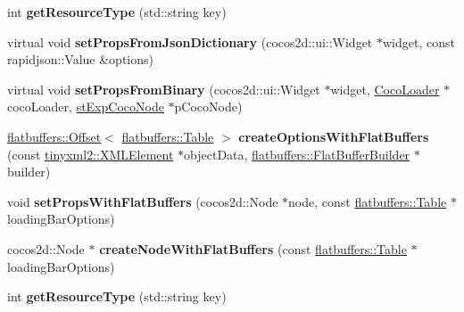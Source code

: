 \begin{DoxyCompactItemize}
int {\bfseries get\+Resource\+Type} (std\+::string key)
\item 
\mbox{\label{classcocostudio_1_1LoadingBarReader_ab5909d35968dfaf4c5348d6fe23d58f0}} 
virtual void {\bfseries set\+Props\+From\+Json\+Dictionary} (cocos2d\+::ui\+::\+Widget $\ast$widget, const rapidjson\+::\+Value \&options)
\item 
\mbox{\label{classcocostudio_1_1LoadingBarReader_accd6738b2c296e267985d13b99b7daa9}} 
virtual void {\bfseries set\+Props\+From\+Binary} (cocos2d\+::ui\+::\+Widget $\ast$widget, \hyperlink{classcocostudio_1_1CocoLoader}{Coco\+Loader} $\ast$coco\+Loader, \hyperlink{structcocostudio_1_1stExpCocoNode}{st\+Exp\+Coco\+Node} $\ast$p\+Coco\+Node)
\item 
\mbox{\label{classcocostudio_1_1LoadingBarReader_a18f5583ff9fbff73f5cb87d180a165f6}} 
\hyperlink{structflatbuffers_1_1Offset}{flatbuffers\+::\+Offset}$<$ \hyperlink{classflatbuffers_1_1Table}{flatbuffers\+::\+Table} $>$ {\bfseries create\+Options\+With\+Flat\+Buffers} (const \hyperlink{classtinyxml2_1_1XMLElement}{tinyxml2\+::\+X\+M\+L\+Element} $\ast$object\+Data, \hyperlink{classflatbuffers_1_1FlatBufferBuilder}{flatbuffers\+::\+Flat\+Buffer\+Builder} $\ast$builder)
\item 
\mbox{\label{classcocostudio_1_1LoadingBarReader_aad065dc19cae6485a9411be6a3f972b6}} 
void {\bfseries set\+Props\+With\+Flat\+Buffers} (cocos2d\+::\+Node $\ast$node, const \hyperlink{classflatbuffers_1_1Table}{flatbuffers\+::\+Table} $\ast$loading\+Bar\+Options)
\item 
\mbox{\label{classcocostudio_1_1LoadingBarReader_aab5da8705f35293d4aa8f4f862fbef21}} 
cocos2d\+::\+Node $\ast$ {\bfseries create\+Node\+With\+Flat\+Buffers} (const \hyperlink{classflatbuffers_1_1Table}{flatbuffers\+::\+Table} $\ast$loading\+Bar\+Options)
\item 
\mbox{\label{classcocostudio_1_1LoadingBarReader_a9600a53194e2544618d982445cd15199}} 
int {\bfseries get\+Resource\+Type} (std\+::string key)
\end{DoxyCompactItemize}
